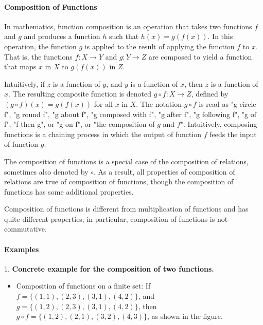 \paragraph{Composition of Functions}

In mathematics, function composition is an operation that takes two functions $f$ and $g$ and produces a function $h$ such that $h(x) = g(f(x))$. In this operation, the function $g$ is applied to the result of applying the function $f$ to $x$. That is, the functions $f : X \to Y$ and $g : Y \to Z$ are composed to yield a function that maps $x$ in $X$ to $g(f(x))$ in $Z$.

Intuitively, if $z$ is a function of $y$, and $y$ is a function of $x$, then $z$ is a function of $x$. The resulting composite function is denoted $g \circ f : X \to Z$, defined by $(g \circ f)(x) = g(f(x))$ for all $x$ in $X$. The notation $g \circ f$ is read as "g circle f", "g round f", "g about f", "g composed with f", "g after f", "g following f", "g of f", "f then g", or "g on f", or "the composition of $g$ and $f$". Intuitively, composing functions is a chaining process in which the output of function $f$ feeds the input of function $g$.

The composition of functions is a special case of the composition of relations, sometimes also denoted by $\circ$. As a result, all properties of composition of relations are true of composition of functions, though the composition of functions has some additional properties.

Composition of functions is different from multiplication of functions and has quite different properties; in particular, composition of functions is not commutative.

\paragraph{Examples}

1. \textbf{Concrete example for the composition of two functions.}


\begin{itemize}
    \item Composition of functions on a finite set: If $f = \{(1, 1), (2, 3), (3, 1), (4, 2)\}$, and $g = \{(1, 2), (2, 3), (3, 1), (4, 2)\}$, then $g \circ f = \{(1, 2), (2, 1), (3, 2), (4, 3)\}$, as shown in the figure.
\end{itemize}

